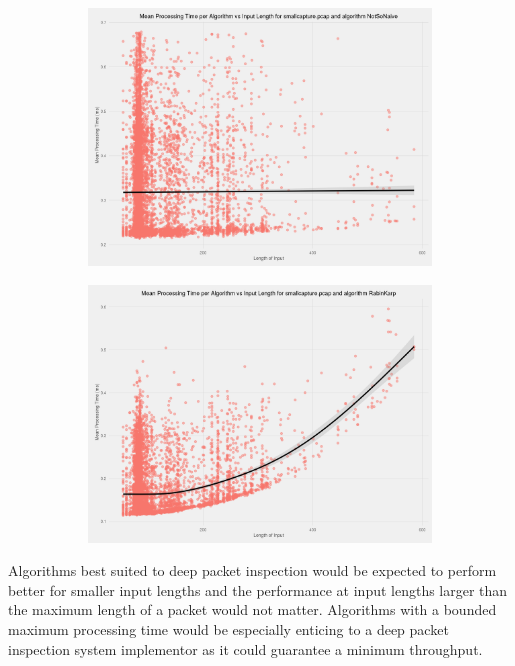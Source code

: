 \documentclass[11pt]{article}
\begin{document}
\begin{figure}
\begin{subfigure}[b]{0.45\textwidth}
      \includegraphics[width=\textwidth]{images/scatter_mean_vs_input_length_NotSoNaive}
  \end{subfigure}
  \begin{subfigure}[b]{0.45\textwidth}
      \includegraphics[width=\textwidth]{images/scatter_mean_vs_input_length_RabinKarp}
  \end{subfigure}
  \caption{}
\end{figure}


Algorithms best suited to deep packet inspection would be expected to perform better for smaller input lengths and the performance at input lengths larger than the maximum length of a packet would not matter. Algorithms with a bounded maximum processing time would be especially enticing to a deep packet inspection system implementor as it could guarantee a minimum throughput.
\end{document}
